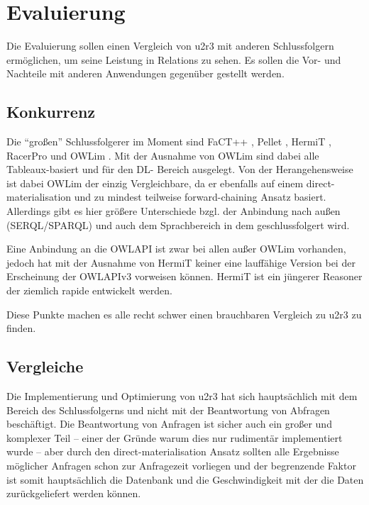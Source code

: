 \chapter{Evaluierung}
Die Evaluierung sollen einen Vergleich von u2r3 mit anderen Schlussfolgern ermöglichen, um seine Leistung in Relations zu sehen. Es sollen die Vor- und Nachteile mit anderen Anwendungen gegenüber gestellt werden.

\section{Konkurrenz}
Die ``großen'' Schlussfolgerer im Moment sind FaCT++ \cite{Factpp}, Pellet \cite{Pellet}, HermiT \cite{HermiT}, RacerPro \cite{RacerPro} und OWLim \cite{OWLim}. Mit der Ausnahme von OWLim sind dabei alle Tableaux-basiert und für den DL- Bereich ausgelegt. Von der Herangehensweise ist dabei OWLim der einzig Vergleichbare, da er ebenfalls auf einem direct-materialisation und zu mindest teilweise forward-chaining Ansatz basiert. Allerdings gibt es hier größere Unterschiede bzgl. der Anbindung nach außen (\mbox{SERQL}/\mbox{SPARQL}) und auch dem Sprachbereich in dem geschlussfolgert wird.

Eine Anbindung an die OWLAPI ist zwar bei allen außer OWLim vorhanden, jedoch hat mit der Ausnahme von HermiT keiner eine lauffähige Version bei der Erscheinung der OWLAPIv3 vorweisen können. HermiT ist ein jüngerer Reasoner der ziemlich rapide entwickelt werden.

Diese Punkte machen es alle recht schwer einen brauchbaren Vergleich zu u2r3 zu finden.

\section{Vergleiche}
\label{abschnitt-vergleiche}
Die Implementierung und Optimierung von u2r3 hat sich hauptsächlich mit dem Bereich des Schlussfolgerns und nicht mit der Beantwortung von Abfragen beschäftigt. Die Beantwortung von Anfragen ist sicher auch ein großer und komplexer Teil -- einer der Gründe warum dies nur rudimentär implementiert wurde -- aber durch den direct-materialisation Ansatz sollten alle Ergebnisse möglicher Anfragen schon zur Anfragezeit vorliegen und der begrenzende Faktor ist somit hauptsächlich die Datenbank und die Geschwindigkeit mit der die Daten zurückgeliefert werden können.


